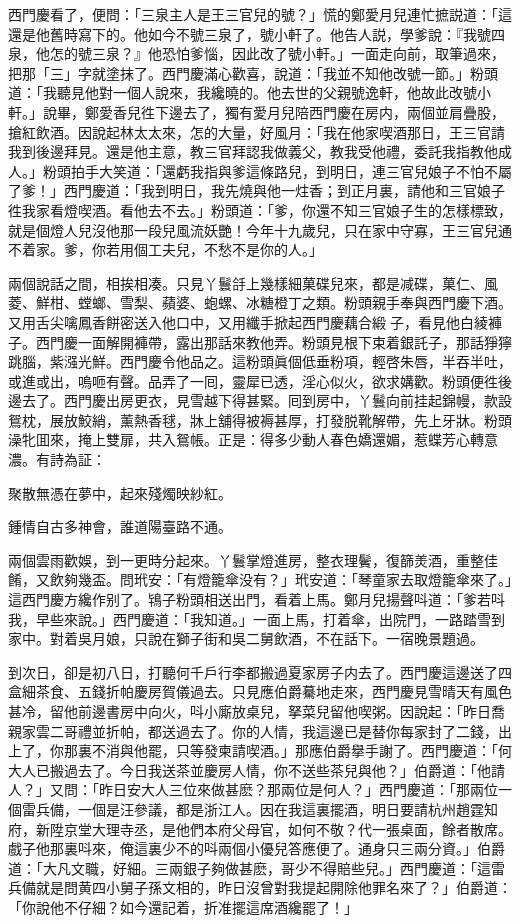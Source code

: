 西門慶看了，便問：「三泉主人是王三官兒的號？」慌的鄭愛月兒連忙摭説道：「這還是他舊時寫下的。他如今不號三泉了，號小軒了。他告人説，學爹說：『我號四泉，他怎的號三泉？』他恐怕爹惱，因此改了號小軒。」一面走向前，取筆過來，把那「三」字就塗抹了。西門慶滿心歡喜，說道：「我並不知他改號一節。」粉頭道：「我聽見他對一個人說來，我纔曉的。他去世的父親號逸軒，他故此改號小軒。」說畢，鄭愛香兒徃下邊去了，獨有愛月兒陪西門慶在房内，兩個並肩疊股，搶紅飲酒。因說起林太太來，怎的大量，好風月：「我在他家喫酒那日，王三官請我到後邊拜見。還是他主意，教三官拜認我做義父，教我受他禮，委託我指教他成人。」粉頭拍手大笑道：「還虧我指與爹這條路兒，到明日，連三官兒娘子不怕不屬了爹！」西門慶道：「我到明日，我先燒與他一炷香；到正月裏，請他和三官娘子徃我家看燈喫酒。看他去不去。」粉頭道：「爹，你還不知三官娘子生的怎樣標致，就是個燈人兒沒他那一段兒風流妖艷！今年十九歲兒，只在家中守寡，王三官兒通不着家。爹，你若用個工夫兒，不愁不是你的人。」

兩個說話之間，相挨相凑。只見丫鬟㧱上幾樣細菓碟兒來，都是减碟，菓仁、風菱、鮮柑、螳螂、雪梨、蘋婆、蚫螺、冰糖橙丁之類。粉頭親手奉與西門慶下酒。又用舌尖噙鳳香餅密送入他口中，又用纖手掀起西門慶藕合緞𧜽子，看見他白綾褲子。西門慶一面解開褲帶，露出那話來教他弄。粉頭見根下束着銀託子，那話猙獰跳腦，紫漒光鮮。西門慶令他品之。這粉頭眞個低垂粉項，輕啓朱唇，半吞半吐，或進或出，嗚咂有聲。品弄了一囘，靈犀已透，淫心似火，欲求媾歡。粉頭便徃後邊去了。西門慶出房更衣，見雪越下得甚緊。囘到房中，丫鬟向前挂起錦幔，款設鴛枕，展放鮫綃，薰熱香毬，牀上舖得被褥甚厚，打發脱靴解帶，先上牙牀。粉頭澡牝囬來，掩上雙扉，共入鴛帳。正是：得多少動人春色嬌還媚，惹蝶芳心轉意濃。有詩為証：

\begin{myquote}
聚散無憑在夢中，起來殘燭映紗紅。

鍾情自古多神會，誰道陽臺路不通。
\end{myquote}

兩個雲雨歡娛，到一更時分起來。丫鬟掌燈進房，整衣理鬢，復篩羙酒，重整佳餚，又飲夠幾盃。問玳安：「有燈籠傘没有？」玳安道：「琴童家去取燈籠傘來了。」這西門慶方纔作别了。鴇子粉頭相送出門，看着上馬。鄭月兒揚聲呌道：「爹若呌我，早些來說。」西門慶道：「我知道。」一面上馬，打着傘，出院門，一路踏雪到家中。對着吳月娘，只說在獅子街和吳二舅飲酒，不在話下。一宿晚景題過。

到次日，卻是初八日，打聽何千戶行李都搬過夏家房子内去了。西門慶這邊送了四盒細茶食、五錢折帕慶房賀儀過去。只見應伯爵驀地走來，西門慶見雪晴天有風色甚冷，留他前邊書房中向火，呌小廝放桌兒，拏菜兒留他喫粥。因說起：「昨日喬親家雲二哥禮並折帕，都送過去了。你的人情，我這邊已是替你每家封了二錢，出上了，你那裏不消與他罷，只等發柬請喫酒。」那應伯爵擧手謝了。西門慶道：「何大人已搬過去了。今日我送茶並慶房人情，你不送些茶兒與他？」伯爵道：「他請人？」又問：「昨日安大人三位來做甚麽？那兩位是何人？」西門慶道：「那兩位一個雷兵備，一個是汪參議，都是浙江人。因在我這裏擺酒，明日要請杭州趙霆知府，新陞京堂大理寺丞，是他們本府父母官，如何不敬？代一張桌面，餘者散席。戲子他那裏呌來，俺這裏少不的呌兩個小優兒答應便了。通身只三兩分資。」伯爵道：「大凡文職，好細。三兩銀子夠做甚麽，哥少不得賠些兒。」西門慶道：「這雷兵備就是問黄四小舅子孫文相的，昨日沒曾對我提起開除他罪名來了？」伯爵道：「你說他不仔細？如今還記着，折准擺這席酒纔罷了！」

